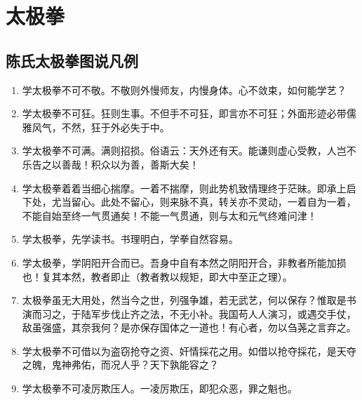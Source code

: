 \chapter{太极拳}

\section{陈氏太极拳图说凡例}

\begin{enumerate}
  \item 学太极拳不可不敬。不敬则外慢师友，内慢身体。心不敛束，如何能学艺？
  \item 学太极拳不可狂。狂则生事。不但手不可狂，即言亦不可狂；外面形迹必带儒雅风气，不然，狂于外必失于中。
  \item 学太极拳不可满。满则招损。俗语云：天外还有天。能谦则虚心受教，人岂不乐告之以善哉！积众以为善，善斯大矣！
  \item 学太极拳着着当细心揣摩。一着不揣摩，则此势机致情理终于茫昧。即承上启下处，尤当留心。此处不留心，则来脉不真，转关亦不灵动，一着自为一着，不能自始至终一气贯通矣！不能一气贯通，则与太和元气终难问津！
  \item 学太极拳，先学读书。书理明白，学拳自然容易。
  \item 学太极拳，学阴阳开合而已。吾身中自有本然之阴阳开合，非教者所能加损也！复其本然，教者即止（教者教以规矩，即大中至正之理）。
  \item 太极拳虽无大用处，然当今之世，列强争雄，若无武艺，何以保存？惟取是书演而习之，于陆军步伐止齐之法，不无小补。我国苟人人演习，或遇交手仗，敌虽强盛，其奈我何？是亦保存国体之一道也！有心者，勿以刍荛之言弃之。
  \item 学太极拳不可借以为盗窃抢夺之资、奸情採花之用。如借以抢夺採花，是天夺之魄，鬼神弗佑，而况人乎？天下孰能容之？
  \item 学太极拳不可凌厉欺压人。一凌厉欺压，即犯众恶，罪之魁也。 
\end{enumerate}
